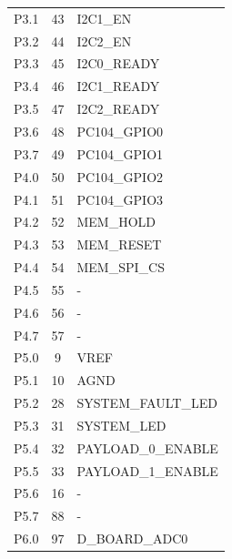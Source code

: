\begin{longtable}{lcl}
    P3.1              & 43                  & I2C1\_EN              \\
    P3.2              & 44                  & I2C2\_EN              \\
    P3.3              & 45                  & I2C0\_READY           \\
    P3.4              & 46                  & I2C1\_READY           \\
    P3.5              & 47                  & I2C2\_READY           \\
    P3.6              & 48                  & PC104\_GPIO0          \\
    P3.7              & 49                  & PC104\_GPIO1          \\
    \midrule
    P4.0              & 50                  & PC104\_GPIO2          \\
    P4.1              & 51                  & PC104\_GPIO3          \\
    P4.2              & 52                  & MEM\_HOLD             \\
    P4.3              & 53                  & MEM\_RESET            \\
    P4.4              & 54                  & MEM\_SPI\_CS          \\
    P4.5              & 55                  & -                     \\
    P4.6              & 56                  & -                     \\
    P4.7              & 57                  & -                     \\
    \midrule
    P5.0              & 9                   & VREF                  \\
    P5.1              & 10                  & AGND                  \\
    P5.2              & 28                  & SYSTEM\_FAULT\_LED    \\
    P5.3              & 31                  & SYSTEM\_LED           \\
    P5.4              & 32                  & PAYLOAD\_0\_ENABLE    \\
    P5.5              & 33                  & PAYLOAD\_1\_ENABLE    \\
    P5.6              & 16                  & -                     \\
    P5.7              & 88                  & -                     \\
    \midrule
    P6.0              & 97                  & D\_BOARD\_ADC0        \\

\end{longtable}
